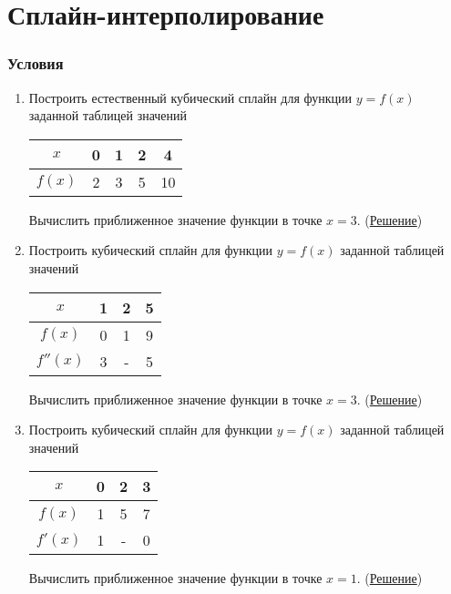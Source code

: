 \documentclass[a4paper, 12pt]{article}
\begin{document}
	\section*{Сплайн-интерполирование}
	\subsubsection*{Условия}
	\begin{enumerate}
		\item Построить естественный кубический сплайн для функции $y = f(x)$ заданной таблицей значений 
		\begin{center}\begin{tabular}[t]{|c|c|c|c|c|}
				\hline
				$x$ & 0 & 1 & 2 & 4 \\
				\hline
				$f(x)$ & 2 & 3 & 5 & 10 \\
				\hline
		\end{tabular}\end{center}
		Вычислить приближенное значение функции в точке $x=3$. (\hyperlink{t1}{Решение})
		
		\item Построить кубический сплайн для функции $y = f(x)$ заданной таблицей значений 
		\begin{center}\begin{tabular}[t]{|c|c|c|c|}
				\hline
				$x$ & 1 & 2 & 5 \\
				\hline
				$f(x)$ & 0 & 1 & 9 \\
				\hline
				$f''(x)$ & 3 & - & 5 \\
				\hline
		\end{tabular}\end{center}
		Вычислить приближенное значение функции в точке $x=3$. (\hyperlink{t2}{Решение})
		
		\item 
		Построить кубический сплайн для функции $y = f(x)$ заданной таблицей значений 
		\begin{center}\begin{tabular}[t]{|c|c|c|c|}
				\hline
				$x$ & 0 & 2 & 3 \\
				\hline
				$f(x)$ & 1 & 5 & 7 \\
				\hline
				$f'(x)$ & 1 & - & 0 \\
				\hline
		\end{tabular}\end{center}
		Вычислить приближенное значение функции в точке $x=1$. (\hyperlink{t3}{Решение})
	\end{enumerate}
	
\end{document}
